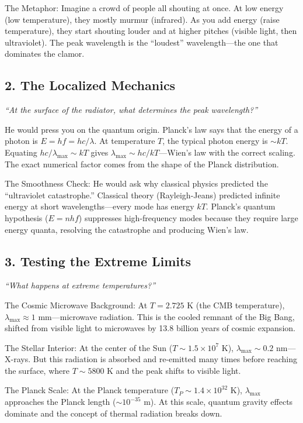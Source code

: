 The Metaphor: Imagine a crowd of people all shouting at once. At low energy (low temperature), they mostly murmur (infrared). As you add energy (raise temperature), they start shouting louder and at higher pitches (visible light, then ultraviolet). The peak wavelength is the ``loudest'' wavelength---the one that dominates the clamor.

\subsection*{2. The Localized Mechanics}
\textit{``At the surface of the radiator, what determines the peak wavelength?''}

He would press you on the quantum origin. Planck's law says that the energy of a photon is $E = hf = hc/\lambda$. At temperature $T$, the typical photon energy is $\sim kT$. Equating $hc/\lambda_{\max} \sim kT$ gives $\lambda_{\max} \sim hc/kT$---Wien's law with the correct scaling. The exact numerical factor comes from the shape of the Planck distribution.

The Smoothness Check: He would ask why classical physics predicted the ``ultraviolet catastrophe.'' Classical theory (Rayleigh-Jeans) predicted infinite energy at short wavelengths---every mode has energy $kT$. Planck's quantum hypothesis ($E = nhf$) suppresses high-frequency modes because they require large energy quanta, resolving the catastrophe and producing Wien's law.

\subsection*{3. Testing the Extreme Limits}
\textit{``What happens at extreme temperatures?''}

The Cosmic Microwave Background: At $T = 2.725$ K (the CMB temperature), $\lambda_{\max} \approx 1$ mm---microwave radiation. This is the cooled remnant of the Big Bang, shifted from visible light to microwaves by 13.8 billion years of cosmic expansion.

The Stellar Interior: At the center of the Sun ($T \sim 1.5 \times 10^7$ K), $\lambda_{\max} \sim 0.2$ nm---X-rays. But this radiation is absorbed and re-emitted many times before reaching the surface, where $T \sim 5800$ K and the peak shifts to visible light.

The Planck Scale: At the Planck temperature ($T_P \sim 1.4 \times 10^{32}$ K), $\lambda_{\max}$ approaches the Planck length ($\sim 10^{-35}$ m). At this scale, quantum gravity effects dominate and the concept of thermal radiation breaks down.


